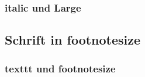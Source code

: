 \documentclass{article}
\begin{document}
\begin{Large}
\blindtext
\end{Large}

\subsubsection{italic und Large}

\begin{Large}
\begin{textit}
\blindtext
\end{textit}
\end{Large}

\subsection{Schrift in footnotesize}

\begin{footnotesize}
\blindtext
\end{footnotesize}

\subsubsection{texttt und footnotesize}

\begin{footnotesize}
\begin{texttt}
\blindtext
\end{texttt}
\end{footnotesize}
\end{document}
